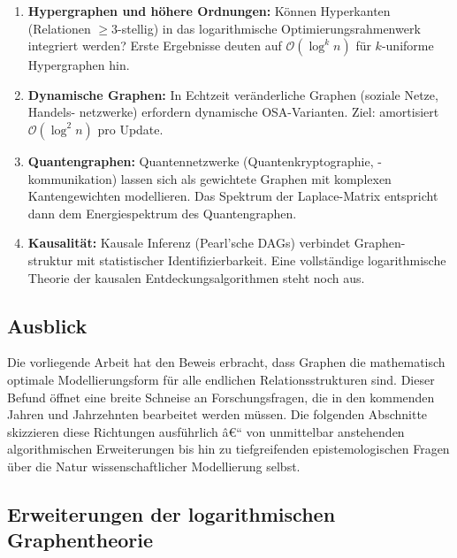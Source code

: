 ﻿\documentclass[12pt,a4paper,twoside]{article}
\theoremstyle{definition}
\theoremstyle{plain}
\theoremstyle{remark}
\begin{document}
\begin{enumerate}
  \item \textbf{Hypergraphen und höhere Ordnungen:}
        Können Hyperkanten (Relationen $\geq 3$-stellig) in das
        logarithmische Optimierungsrahmenwerk integriert werden?
        Erste Ergebnisse deuten auf
        $\mathcal{O}(\log^k n)$ für $k$-uniforme Hypergraphen hin.

  \item \textbf{Dynamische Graphen:}
        In Echtzeit veränderliche Graphen (soziale Netze, Handels-
        netzwerke) erfordern dynamische OSA-Varianten.  Ziel:
        amortisiert $\mathcal{O}(\log^2 n)$ pro Update.

  \item \textbf{Quantengraphen:}
        Quantennetzwerke (Quantenkryptographie, -kommunikation)
        lassen sich als gewichtete Graphen mit komplexen
        Kantengewichten modellieren.  Das Spektrum der
        Laplace-Matrix entspricht dann dem Energiespektrum
        des Quantengraphen.

  \item \textbf{Kausalität:}
        Kausale Inferenz (Pearl'sche DAGs) verbindet Graphen-
        struktur mit statistischer Identifizierbarkeit.  Eine
        vollständige logarithmische Theorie der kausalen
        Entdeckungsalgorithmen steht noch aus.
\end{enumerate}

\subsection{Ausblick}
\label{sec:ausblick}

Die vorliegende Arbeit hat den Beweis erbracht, dass Graphen die
mathematisch optimale Modellierungsform für alle endlichen
Relationsstrukturen sind.  Dieser Befund öffnet eine breite
Schneise an Forschungsfragen, die in den kommenden Jahren und
Jahrzehnten bearbeitet werden müssen.  Die folgenden Abschnitte
skizzieren diese Richtungen ausführlich â€“ von unmittelbar
anstehenden algorithmischen Erweiterungen bis hin zu tiefgreifenden
epistemologischen Fragen über die Natur wissenschaftlicher
Modellierung selbst.

\subsection{Erweiterungen der logarithmischen Graphentheorie}
\label{sub:log_ext}
\end{document}
